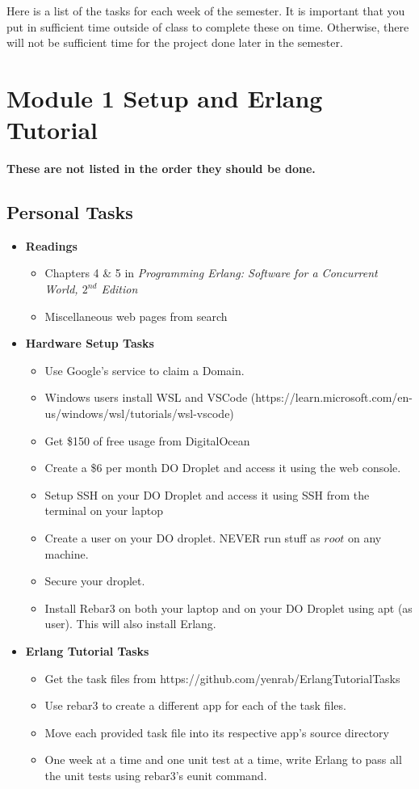 \documentclass[12pt]{amsart}
\begin{document}
Here is a list of the tasks for each week of the semester. It is important that you put in sufficient time outside of class to complete these on time. Otherwise, there will not be sufficient time for the project done later in the semester.

\section*{Module 1 Setup and Erlang Tutorial} 
\textbf{These are not listed in the order they should be done.} 
\subsection*{Personal Tasks}
	\begin{itemize}
	\item \textbf{Readings}
	\begin{itemize}
		\item Chapters 4 \& 5 in \textit{Programming Erlang: Software for a Concurrent World, $2^{nd}$ Edition}
		\item Miscellaneous web pages from search
	\end{itemize}
	\end{itemize}
	\begin{itemize}
		\item \textbf{Hardware Setup Tasks}
		\begin{itemize}
		\item Use Google's service to claim a Domain.
        		\item Windows users install WSL and VSCode (https://learn.microsoft.com/en-us/windows/wsl/tutorials/wsl-vscode)
        		\item Get \$150 of free usage from DigitalOcean
        		\item Create a \$6 per month DO Droplet and access it using the web console.
		\item Setup SSH on your DO Droplet and access it using SSH from the terminal on your laptop
		\item Create a user on your DO droplet. NEVER run stuff as $root$ on any machine.
		\item Secure your droplet.
		\item Install Rebar3 on both your laptop and on your DO Droplet using apt (as user). This will also install Erlang.
		\end{itemize}
		\item \textbf{Erlang Tutorial Tasks}
		\begin{itemize}
		\item Get the task files from https://github.com/yenrab/ErlangTutorialTasks
		\item Use rebar3 to create a different app for each of the task files. 
		\item Move each provided task file into its respective app's source directory
		\item One week at a time and one unit test at a time, write Erlang to pass all the unit tests using rebar3's eunit command.
	\end{itemize}
		\end{itemize}
\end{document}
